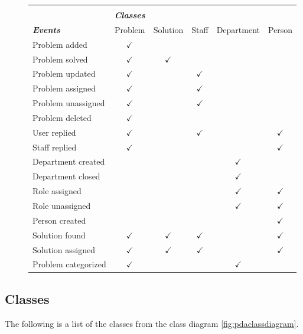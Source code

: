 \begin{figure}[]
\begin{tabular}{ l c c c c c} \hline
\\
&\emph{\textbf{Classes}} &  &  & &  \\ 
\emph{\textbf{Events}} 		& Problem 		& Solution 			& Staff 			& Department & Person \\ \hline
 Problem added 			& $ \checkmark $ 	&  				&  				& &  \\ 
 Problem solved 			& $ \checkmark $ 	& $ \checkmark $ 	& 				& &  \\ 
 Problem updated 			& $ \checkmark $ 	&  				& $ \checkmark $ 	&  &  \\ 
 Problem assigned 			& $ \checkmark $ 	&  				& $ \checkmark $ 	&  &  \\ 
 Problem unassigned 		& $ \checkmark $ 	&  				& $ \checkmark $ 	&  &  \\ 
 Problem deleted 			& $ \checkmark $ 	&  				&  				&  &  \\ 
 User replied 				& $ \checkmark $ 	&  				& $ \checkmark $ 	&  & $ \checkmark $  \\ 
 Staff replied 				& $ \checkmark $ 	&  				&  				&  &  $ \checkmark $ \\ 
 Department created 			&  				&  				&  				& $ \checkmark $ &  \\ 
 Department closed 			&  				&  				&  				& $ \checkmark $ &  \\ 
 Role assigned 				&  				&  				&  				& $ \checkmark $ & $ \checkmark $  \\ 
 Role unassigned 			&  				&  				&  				&  $ \checkmark $  & $ \checkmark $ \\ 
 Person created 			&  				&  				&  				&  & $ \checkmark $ \\ 
 Solution found 				& $ \checkmark $ 	& $ \checkmark $ 	& $ \checkmark $ 	&  & $ \checkmark $ \\ 
 Solution assigned			& $ \checkmark $ 	& $ \checkmark $ 	& $ \checkmark $ 	&  & $ \checkmark $ \\ 
 Problem categorized			& $ \checkmark $ 	&  				&  				& $ \checkmark $ &  \\ \hline
\end{tabular}
\label{fig:classeseventstable}
\end{figure}

\subsection{Classes}
The following is a list of the classes from the class diagram \ref{fig:pdaclassdiagram}.

